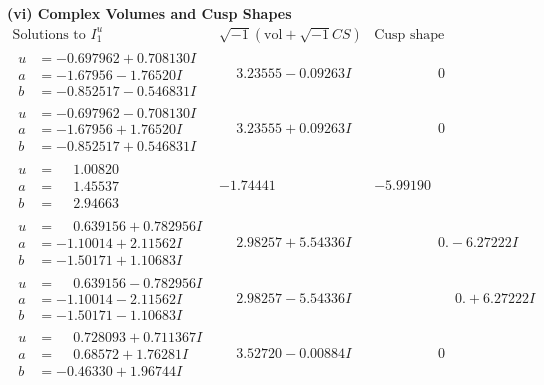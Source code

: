 \documentclass[1p]{elsarticle_modified}
\theoremstyle{definition}
\newcommand{\I}{\sqrt{-1}}
\begin{document}
\newpage\flushleft \textbf{(vi) Complex Volumes and Cusp Shapes}
$$\begin{array}{c|c|c}  
\text{Solutions to }I^u_{1}& \I (\text{vol} + \sqrt{-1}CS) & \text{Cusp shape}\\
 \hline 
\begin{aligned}
u &= -0.697962 + 0.708130 I \\
a &= -1.67956 - 1.76520 I \\
b &= -0.852517 - 0.546831 I\end{aligned}
 & \phantom{-}3.23555 - 0.09263 I & \phantom{-0.000000 } 0 \\ \hline\begin{aligned}
u &= -0.697962 - 0.708130 I \\
a &= -1.67956 + 1.76520 I \\
b &= -0.852517 + 0.546831 I\end{aligned}
 & \phantom{-}3.23555 + 0.09263 I & \phantom{-0.000000 } 0 \\ \hline\begin{aligned}
u &= \phantom{-}1.00820\phantom{ +0.000000I} \\
a &= \phantom{-}1.45537\phantom{ +0.000000I} \\
b &= \phantom{-}2.94663\phantom{ +0.000000I}\end{aligned}
 & -1.74441\phantom{ +0.000000I} & -5.99190\phantom{ +0.000000I} \\ \hline\begin{aligned}
u &= \phantom{-}0.639156 + 0.782956 I \\
a &= -1.10014 + 2.11562 I \\
b &= -1.50171 + 1.10683 I\end{aligned}
 & \phantom{-}2.98257 + 5.54336 I & \phantom{-0.000000 } 0. - 6.27222 I \\ \hline\begin{aligned}
u &= \phantom{-}0.639156 - 0.782956 I \\
a &= -1.10014 - 2.11562 I \\
b &= -1.50171 - 1.10683 I\end{aligned}
 & \phantom{-}2.98257 - 5.54336 I & \phantom{-0.000000 -}0. + 6.27222 I \\ \hline\begin{aligned}
u &= \phantom{-}0.728093 + 0.711367 I \\
a &= \phantom{-}0.68572 + 1.76281 I \\
b &= -0.46330 + 1.96744 I\end{aligned}
 & \phantom{-}3.52720 - 0.00884 I & \phantom{-0.000000 } 0 \\ \hline\begin{aligned}

\end{aligned}
\end{array}$$
\end{document}
